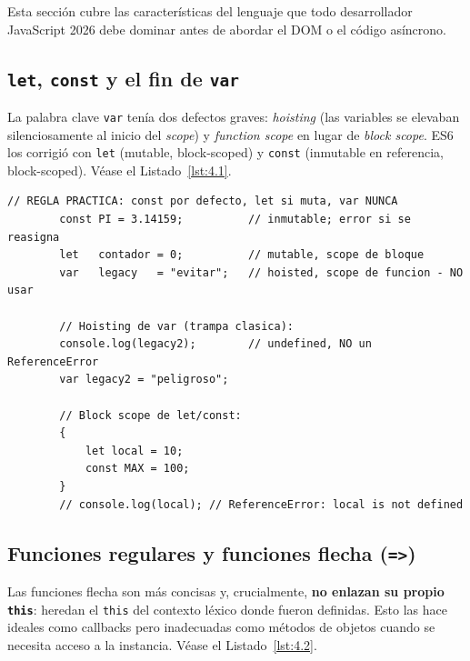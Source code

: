 \documentclass[11pt,a4paper,openany]{book}
\begin{document}
	Esta sección cubre las características del lenguaje que todo
	desarrollador JavaScript 2026 debe dominar antes de abordar el DOM
	o el código asíncrono.
	
	\subsection{\texttt{let}, \texttt{const} y el fin de \texttt{var}}
	\label{sub:4.letconst}
	
	La palabra clave \texttt{var} tenía dos defectos graves:
	\emph{hoisting} (las variables se elevaban silenciosamente al
	inicio del \emph{scope}) y \emph{function scope} en lugar de
	\emph{block scope}. ES6 los corrigió con \texttt{let}
	(mutable, block-scoped) y \texttt{const} (inmutable en
	referencia, block-scoped). Véase el Listado~\ref{lst:4.1}.
	
	\begin{lstlisting}[style=js,numbers=none,caption={Variables en JavaScript moderno},
		label=lst:4.1]
		// REGLA PRACTICA: const por defecto, let si muta, var NUNCA
		const PI = 3.14159;          // inmutable; error si se reasigna
		let   contador = 0;          // mutable, scope de bloque
		var   legacy   = "evitar";   // hoisted, scope de funcion - NO usar
		
		// Hoisting de var (trampa clasica):
		console.log(legacy2);        // undefined, NO un ReferenceError
		var legacy2 = "peligroso";
		
		// Block scope de let/const:
		{
			let local = 10;
			const MAX = 100;
		}
		// console.log(local); // ReferenceError: local is not defined
	\end{lstlisting}
	
	\subsection{Funciones regulares y funciones flecha (\texttt{=>})}
	\label{sub:4.arrow}
	
	Las funciones flecha son más concisas y, crucialmente, \textbf{no
		enlazan su propio \texttt{this}}: heredan el \texttt{this} del
	contexto léxico donde fueron definidas. Esto las hace ideales como
	callbacks pero inadecuadas como métodos de objetos cuando se
	necesita acceso a la instancia. Véase el Listado~\ref{lst:4.2}.
	
\end{document}
